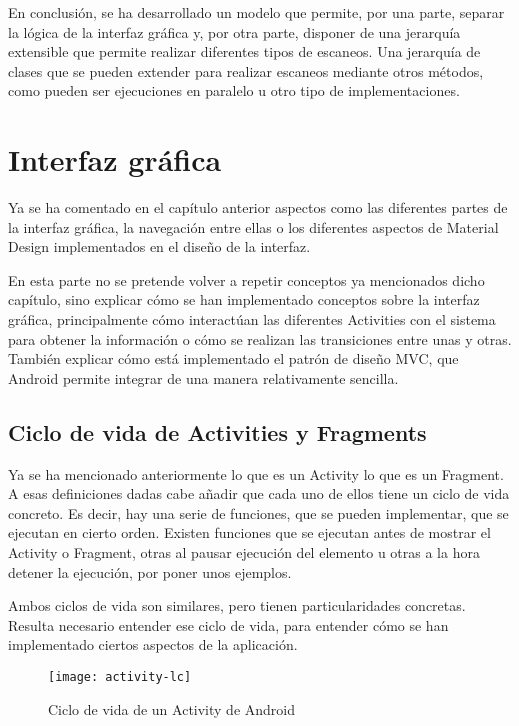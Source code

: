 En conclusión, se ha desarrollado un modelo que permite, por una parte, separar la lógica de la interfaz gráfica y, por otra parte, disponer de una jerarquía extensible que permite realizar diferentes tipos de escaneos. Una jerarquía de clases que se pueden extender para realizar escaneos mediante otros métodos, como pueden ser ejecuciones en paralelo u otro tipo de implementaciones.


\section{Interfaz gráfica}

Ya se ha comentado en el capítulo anterior aspectos como las diferentes partes de la interfaz gráfica, la navegación entre ellas o los diferentes aspectos de Material Design implementados en el diseño de la interfaz.

En esta parte no se pretende volver a repetir conceptos ya mencionados dicho capítulo, sino explicar cómo se han implementado conceptos sobre la interfaz gráfica, principalmente cómo interactúan las diferentes Activities con el sistema para obtener la información o cómo se realizan las transiciones entre unas y otras. También explicar cómo está implementado el patrón de diseño MVC, que Android permite integrar de una manera relativamente sencilla.

\subsection{Ciclo de vida de Activities y Fragments}

Ya se ha mencionado anteriormente lo que es un Activity lo que es un Fragment. A esas definiciones dadas cabe añadir que cada uno de ellos tiene un ciclo de vida concreto. Es decir, hay una serie de funciones, que se pueden implementar, que se ejecutan en cierto orden. Existen funciones que se ejecutan antes de mostrar el Activity o Fragment, otras al pausar ejecución del elemento u otras a la hora detener la ejecución, por poner unos ejemplos.

Ambos ciclos de vida son similares, pero tienen particularidades concretas. Resulta necesario entender ese ciclo de vida, para entender cómo se han implementado ciertos aspectos de la aplicación.

\begin{figure}[H]
	\centering
	\texttt{[image: activity-lc]}
	\caption{Ciclo de vida de un Activity de Android}
	\label{fig:activity-lc}
\end{figure}

